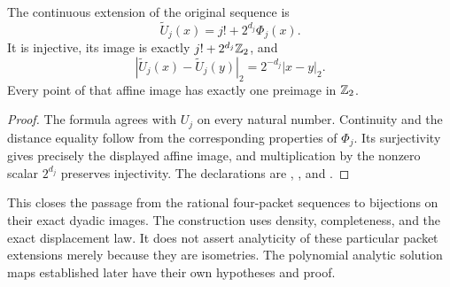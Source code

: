 \begin{corollary}
\label{cor:arith-affine-image}
The continuous extension of the original sequence is
\[
 \widetilde U_j(x)=j!+2^{d_j}\Phi_j(x).
\]
It is injective, its image is exactly $j!+2^{d_j}\mathbb Z_2$, and
\[
 |\widetilde U_j(x)-\widetilde U_j(y)|_2
     =2^{-d_j}|x-y|_2.
\]
Every point of that affine image has exactly one preimage in $\mathbb Z_2$.
\end{corollary}

\begin{proof}
The formula agrees with $U_j$ on every natural number.  Continuity and
the distance equality follow from the corresponding properties of
$\Phi_j$.  Its surjectivity gives precisely the displayed affine image,
and multiplication by the nonzero scalar $2^{d_j}$ preserves injectivity.
The declarations are
,
, and
.
\end{proof}

This closes the passage from the rational four-packet sequences to
bijections on their exact dyadic images.  The construction uses density,
completeness, and the exact displacement law.  It does not assert
analyticity of these particular packet extensions merely because they
are isometries.  The polynomial analytic solution maps established later
have their own hypotheses and proof.

